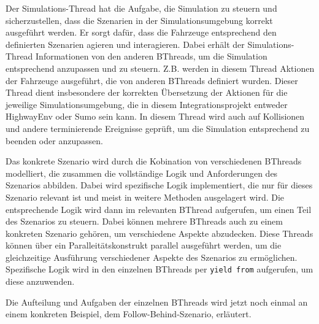 Der Simulations-Thread hat die Aufgabe, die Simulation zu steuern und sicherzustellen, dass die Szenarien in der Simulationsumgebung korrekt ausgeführt werden. Er sorgt dafür, dass die Fahrzeuge entsprechend den definierten Szenarien agieren und interagieren.
Dabei erhält der Simulations-Thread Informationen von den anderen BThreads, um die Simulation entsprechend anzupassen und zu steuern. Z.B. werden in diesem Thread Aktionen der Fahrzeuge ausgeführt, die von anderen BThreads definiert wurden.
Dieser Thread dient insbesondere der korrekten Übersetzung der Aktionen für die jeweilige Simulationsumgebung, die in diesem Integrationsprojekt entweder HighwayEnv oder Sumo sein kann.
In diesem Thread wird auch auf Kollisionen und andere terminierende Ereignisse geprüft, um die Simulation entsprechend zu beenden oder anzupassen.

Das konkrete Szenario wird durch die Kobination von verschiedenen BThreads modelliert, die zusammen die vollständige Logik und Anforderungen des Szenarios abbilden. Dabei wird spezifische Logik implementiert, die nur für dieses Szenario relevant ist und meist in weitere Methoden ausgelagert wird.
Die entsprechende Logik wird dann im relevanten BThread aufgerufen, um einen Teil des Szenarios zu steuern. Dabei können mehrere BThreads auch zu einem konkreten Szenario gehören, um verschiedene Aspekte abzudecken.
Diese Threads können über ein Paralleitätskonstrukt parallel ausgeführt werden, um die gleichzeitige Ausführung verschiedener Aspekte des Szenarios zu ermöglichen. Spezifische Logik wird in den einzelnen BThreads per \texttt{yield from} aufgerufen, um diese anzuwenden.

Die Aufteilung und Aufgaben der einzelnen BThreads wird jetzt noch einmal an einem konkreten Beispiel, dem Follow-Behind-Szenario, erläutert.
